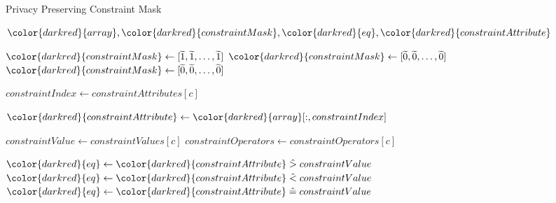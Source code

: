 \begin{algorithm}[H]
\caption{Privacy Preserving Constraint Mask}\label{a:filters-constraint-mask}
\begin{algorithmic}[1]
\renewcommand{\algorithmicrequire}{\textbf{Private Vars:}}
\Require ${\color{darkred}{array}}, {\color{darkred}{constraintMask}}, {\color{darkred}{eq}}, {\color{darkred}{constraintAttribute}}$


        \State ${\color{darkred}{constraintMask}} \gets [\enc{1}, \enc{1}, \dots, \enc{1}]$ 
        \State ${\color{darkred}{constraintMask}} \gets [\enc{0}, \enc{0}, \dots, \enc{0}]$ 
        \State ${\color{darkred}{constraintMask}} \gets [\enc{0}, \enc{0}, \dots, \enc{0}]$ 
    \EndIf


        \State $constraintIndex \gets constraintAttributes[c]$

        \State ${\color{darkred}{constraintAttribute}} \gets {\color{darkred}{array}}[:, constraintIndex]$

        \State $constraintValue \gets constraintValues[c]$
        \State $constraintOperators \gets constraintOperators[c]$

            \State ${\color{darkred}{eq}} \gets {\color{darkred}{constraintAttribute}} \hgt constraintValue$ 
            \State ${\color{darkred}{eq}} \gets {\color{darkred}{constraintAttribute}} \hlt constraintValue$
            \State ${\color{darkred}{eq}} \gets {\color{darkred}{constraintAttribute}} \heq constraintValue$
        \EndIf


\end{algorithmic}
\end{algorithm}

